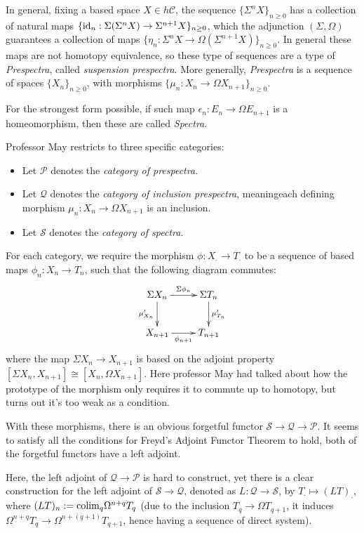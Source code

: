 \documentclass{article}
\begin{document}
In general, fixing a based space $X\in h\mathcal{C}$, the sequence $\{\Sigma^n X\}_{n\geq 0}$ has a collection of natural maps $\{\mathrm{id}_n:\Sigma (\Sigma^n X)\rightarrow \Sigma^{n+1}X\}_{n\geq 0}$, which the adjunction $(\Sigma, \Omega)$ guarantees a collection of maps $\{\eta_n:\Sigma^n X\rightarrow \Omega (\Sigma^{n+1}X)\}_{n\geq 0}$. In general these maps are not homotopy equivalence, so these type of sequences are a type of \emph{Prespectra}, called \emph{suspension prespectra}. More generally, \emph{Prespectra} is a sequence of spaces $\{X_n\}_{n\geq 0}$, with morphisms $\{\mu_n:X_n\rightarrow \Omega X_{n+1}\}_{n\geq 0}$.

For the strongest form possible, if such map $\epsilon_n:E_n\rightarrow \Omega E_{n+1}$ is a homeomorphism, then these are called \emph{Spectra}.

\hfil

Professor May restricts to three specific categories: 
\begin{itemize}
    \item Let $\mathcal{P}$ denotes the \emph{category of prespectra}.
    \item Let $\mathcal{Q}$ denotes the \emph{category of inclusion prespectra}, meaningeach defining morphism $\mu_n:X_n\rightarrow \Omega X_{n+1}$ is an inclusion.
    \item Let $\mathcal{S}$ denotes the \emph{category of spectra}.
\end{itemize}
For each category, we require the morphism $\phi:X_\cdot\rightarrow T_\cdot$ to be a sequence of based maps $\phi_n:X_n\rightarrow T_n$, such that the following diagram commutes:
\[\xymatrix{
    \Sigma X_n \ar[d]_-{\mu'_{X_n}} \ar[r]^-{\Sigma\phi_n} & \Sigma T_n \ar[d]^-{\mu'_{T_n}}\\
    X_{n+1} \ar[r]_-{\phi_{n+1}} & T_{n+1}
}\]
where the map $\Sigma X_n\rightarrow X_{n+1}$ is based on the adjoint property $[\Sigma X_n,X_{n+1}]\cong [X_n,\Omega X_{n+1}]$. Here professor May had talked about how the prototype of the morphism only requires it to commute up to homotopy, but turns out it's too weak as a condition.

\hfil

With these morphisms, there is an obvious forgetful functor $\mathcal{S}\rightarrow \mathcal{Q}\rightarrow \mathcal{P}$. It seems to satisfy all the conditions for Freyd's Adjoint Functor Theorem to hold, both of the forgetful functors have a left adjoint.

Here, the left adjoint of $\mathcal{Q} \rightarrow \mathcal{P}$ is hard to construct, yet there is a clear construction for the left adjoint of $\mathcal{S}\rightarrow \mathcal{Q}$, denoted as $L:\mathcal{Q}\rightarrow\mathcal{S}$, by $T_\cdot \mapsto (LT)_\cdot$, where $(LT)_n := \mathrm{colim}_{q}\Omega^{n+q}T_q$ (due to the inclusion $T_q\rightarrow \Omega T_{q+1}$, it induces $\Omega^{n+q}T_q\rightarrow \Omega^{n+(q+1)}T_{q+1}$, hence having a sequence of direct system).
\end{document}
